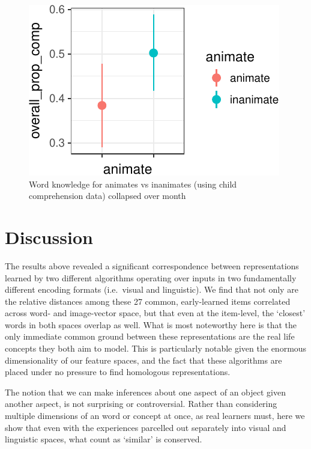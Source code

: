 \documentclass[10pt, letterpaper]{article}
\newenvironment{CodeChunk}{}{}
\begin{document}
\begin{CodeChunk}
\begin{figure}[tb]
\includegraphics{figs/animacy-aoa-comp-graph-1} \caption[Word knowledge for animates vs inanimates (using child comprehension data) collapsed over month]{Word knowledge for animates vs inanimates (using child comprehension data) collapsed over month}\label{fig:animacy-aoa-comp-graph}
\end{figure}
\end{CodeChunk}

\section{Discussion}\label{discussion}

The results above revealed a significant correspondence between
representations learned by two different algorithms operating over
inputs in two fundamentally different encoding formats (i.e.~visual and
linguistic). We find that not only are the relative distances among
these 27 common, early-learned items correlated across word- and
image-vector space, but that even at the item-level, the `closest' words
in both spaces overlap as well. What is most noteworthy here is that the
only immediate common ground between these representations are the real
life concepts they both aim to model. This is particularly notable given
the enormous dimensionality of our feature spaces, and the fact that
these algorithms are placed under no pressure to find homologous
representations.

The notion that we can make inferences about one aspect of an object
given another aspect, is not surprising or controversial. Rather than
considering multiple dimensions of an word or concept at once, as real
learners must, here we show that even with the experiences parcelled out
separately into visual and linguistic spaces, what count as `similar' is
conserved.
\end{document}
